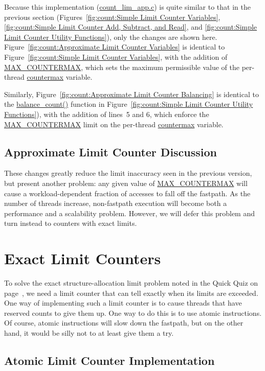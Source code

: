 Because this implementation (\url{count_lim_app.c}) is quite similar to
that in the previous section
(Figures~\ref{fig:count:Simple Limit Counter Variables},
\ref{fig:count:Simple Limit Counter Add, Subtract, and Read}, and
\ref{fig:count:Simple Limit Counter Utility Functions}),
only the changes are shown here.
Figure~\ref{fig:count:Approximate Limit Counter Variables}
is identical to
Figure~\ref{fig:count:Simple Limit Counter Variables},
with the addition of \url{MAX_COUNTERMAX}, which sets the maximum
permissible value of the per-thread \url{countermax} variable.

Similarly,
Figure~\ref{fig:count:Approximate Limit Counter Balancing}
is identical to the \url{balance_count()} function in
Figure~\ref{fig:count:Simple Limit Counter Utility Functions}),
with the addition of lines~5 and 6, which enforce the
\url{MAX_COUNTERMAX} limit on the per-thread \url{countermax} variable.

\subsection{Approximate Limit Counter Discussion}

These changes greatly reduce the limit inaccuracy seen in the previous version,
but present another problem: any given value of \url{MAX_COUNTERMAX}
will cause a workload-dependent fraction of accesses to fall off the
fastpath.
As the number of threads increase, non-fastpath execution will become both
a performance and a scalability problem.
However, we will defer this problem and turn instead to counters
with exact limits.

\section{Exact Limit Counters}
\label{sec:count:Exact Limit Counters}

To solve the exact structure-allocation limit problem noted in the
Quick Quiz on
page~\pageref{chp:Counting},
we need a limit counter that can tell exactly when its limits are
exceeded.
One way of implementing such a limit counter is to
cause threads that have reserved counts to give them up.
One way to do this is to use atomic instructions.
Of course, atomic instructions will slow down the fastpath, but on the
other hand, it would be silly not to at least give them a try.

\subsection{Atomic Limit Counter Implementation}
\label{sec:count:Atomic Limit Counter Implementation}

